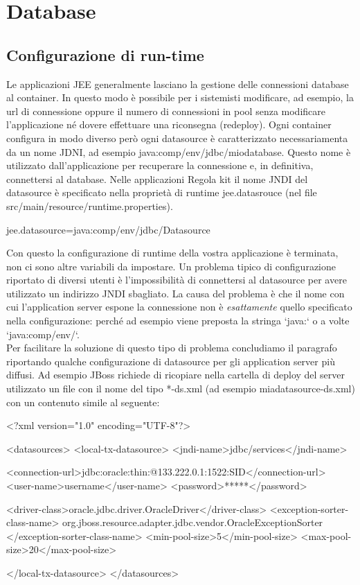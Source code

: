 \chapter{Database}\label{chap:database}

\section{Configurazione di run-time}
Le applicazioni JEE generalmente lasciano la gestione delle connessioni database al container. In questo modo è possibile per i sistemisti modificare, ad esempio, la url di connessione oppure il numero di connessioni in pool senza modificare l'applicazione né dovere effettuare una riconsegna (redeploy). Ogni container configura in modo diverso però ogni datasource è caratterizzato necessariamenta da un nome JDNI, ad esempio java:comp/env/jdbc/miodatabase. Questo nome è utilizzato dall'applicazione per recuperare la connessione e, in definitiva, connettersi al database. 
Nelle applicazioni Regola kit il nome JNDI del datasource è specificato nella proprietà di runtime jee.datasrouce (nel file  src/main/resource/runtime.properties). 

\begin{bash}
jee.datasource=java:comp/env/jdbc/Datasource
\end{bash}

Con questo la configurazione di runtime della vostra applicazione è terminata, non ci sono altre variabili da impostare. Un problema tipico di configurazione riportato di diversi utenti è l'impossibilità di connettersi al datasource per avere utilizzato un indirizzo JNDI sbagliato. La causa del problema  è che il nome con cui l'application server espone la connessione non è \emph{esattamente} quello specificato nella configurazione: perché ad esempio viene preposta la stringa `java:` o a volte `java:comp/env/`.  
\\
Per facilitare la soluzione di questo tipo di problema concludiamo il paragrafo riportando qualche configurazione di datasource per gli application server più diffusi. Ad esempio  JBoss richiede di ricopiare nella cartella di deploy del server utilizzato un file con il nome del tipo *-ds.xml (ad esempio miadatasource-ds.xml) con un contenuto simile al seguente:

\begin{xml}
<?xml version="1.0" encoding="UTF-8"?>

<datasources>
 <local-tx-datasource>
    <jndi-name>jdbc/services</jndi-name> 
    
    <connection-url>jdbc:oracle:thin:@133.222.0.1:1522:SID</connection-url>
    <user-name>username</user-name>
    <password>*****</password>
  
    <driver-class>oracle.jdbc.driver.OracleDriver</driver-class>
    <exception-sorter-class-name>
       org.jboss.resource.adapter.jdbc.vendor.OracleExceptionSorter
    </exception-sorter-class-name>
    <min-pool-size>5</min-pool-size>
    <max-pool-size>20</max-pool-size>

 </local-tx-datasource>
</datasources>
\end{xml}


